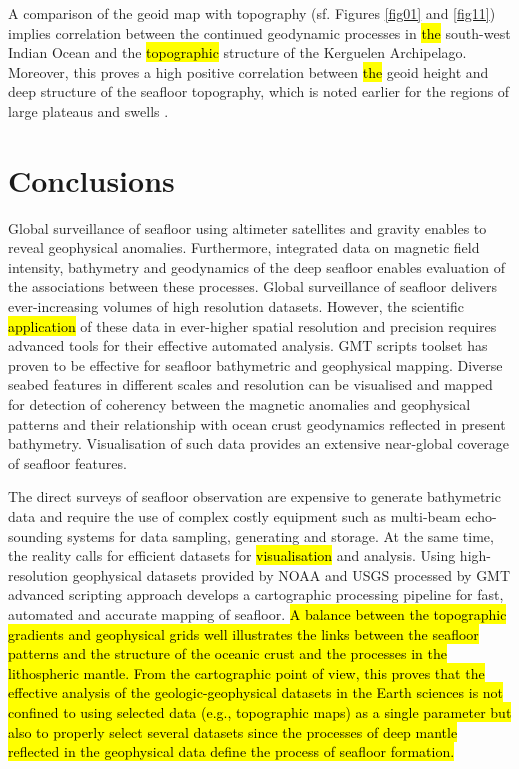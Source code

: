 \documentclass[geomatics,article,submit,pdftex,moreauthors]{Definitions/mdpi}
\begin{document}
A comparison of the geoid map with topography (sf. Figures \ref{fig01} and \ref{fig11}) implies correlation between the continued geodynamic processes in \hl{the }south-west Indian Ocean and the \hl{topographic} structure of the Kerguelen Archipelago. Moreover, this proves a high positive correlation between \hl{the }geoid height and deep structure of the seafloor topography, which is noted earlier for the regions of large plateaus and swells \cite{SandwellMacKenzie}. 

\section{Conclusions}

Global surveillance of seafloor using altimeter satellites and gravity enables to reveal geophysical anomalies. Furthermore, integrated data on magnetic field intensity, bathymetry and geodynamics of the deep seafloor enables evaluation of the associations between these processes. Global surveillance of seafloor delivers ever-increasing volumes of high resolution datasets. However, the scientific \hl{application} of these data in ever-higher spatial resolution and precision requires advanced tools  for their effective automated analysis. GMT scripts toolset has proven to be effective for seafloor bathymetric and geophysical mapping. Diverse seabed features in different scales and resolution can be visualised and mapped for detection of coherency between the magnetic anomalies and geophysical patterns and their relationship with ocean crust geodynamics reflected in present bathymetry. Visualisation of such data provides an extensive near-global coverage of seafloor features. 

The direct surveys of seafloor observation are expensive to generate bathymetric data and require the use of complex costly equipment such as multi-beam echo-sounding systems for data sampling, generating and storage. At the same time, the reality calls for efficient datasets for \hl{visualisation} and analysis. Using high-resolution geophysical datasets provided by NOAA and USGS processed by GMT advanced scripting approach develops a cartographic processing pipeline for fast, automated and accurate mapping of seafloor. \hl{A balance between the topographic gradients and geophysical grids well illustrates the links between the seafloor patterns and the structure of the oceanic crust and the processes in the lithospheric mantle. From the cartographic point of view, this proves that the effective analysis of the geologic-geophysical datasets in the Earth sciences is not confined to using selected data (e.g., topographic maps) as a single parameter but also to properly select several datasets since the processes of deep mantle reflected in the geophysical data define the process of seafloor formation. }
\end{document}
